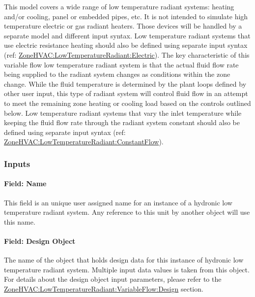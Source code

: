 This model covers a wide range of low temperature radiant systems: heating and/or cooling, panel or embedded pipes, etc. It is not intended to simulate high temperature electric or gas radiant heaters. Those devices will be handled by a separate model and different input syntax. Low temperature radiant systems that use electric resistance heating should also be defined using separate input syntax (ref: \hyperref[zonehvaclowtemperatureradiantelectric]{ZoneHVAC:LowTemperatureRadiant:Electric}).  The key characteristic of this variable flow low temperature radiant system is that the actual fluid flow rate being supplied to the radiant system changes as conditions within the zone change.  While the fluid temperature is determined by the plant loops defined by other user input, this type of radiant system will control fluid flow in an attempt to meet the remaining zone heating or cooling load based on the controls outlined below.   Low temperature radiant systems that vary the inlet temperature while keeping the fluid flow rate through the radiant system constant should also be defined using separate input syntax (ref: \hyperref[zonehvaclowtemperatureradiantconstantflow]{ZoneHVAC:LowTemperatureRadiant:ConstantFlow}).

\subsubsection{Inputs}\label{inputs-5-022}

\paragraph{Field: Name}\label{field-name-5-018}

This field is an unique user assigned name for an instance of a hydronic low temperature radiant system. Any reference to this unit by another object will use this name.

\paragraph{Field: Design Object}\label{Varflow_DesignObjectName}

The name of the object that holds design data for this instance of hydronic low temperature radiant system. Multiple input data values is taken from this object. For details about the design object input parameters, please refer to the \hyperref[zonehvaclowtemperatureradiantvariableflowdesign]{ZoneHVAC:LowTemperatureRadiant:VariableFlow:Design} section.

